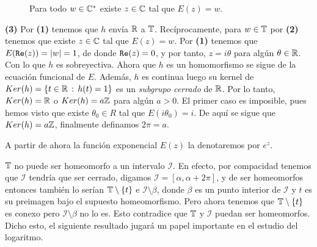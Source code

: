 \begin{dem}
\begin{figure}[H]
        \caption{Para todo \(w\in \mathbb{C}^*\) existe \(z\in \mathbb{C}\) tal que \(E(z)=w\).}
    \end{figure}
    {\bf (3)} Por {\bf(1)} tenemos que \(h\) envía \(\mathbb{R}\) a \(\mathbb{T}\). Recíprocamente, para \(w\in\mathbb{T}\) por {\bf (2)} tenemos que existe
    \(z\in \mathbb{C}\) tal que \(E(z)= w\). Por {\bf (1)} tenemos que \(E(\mathtt{Re}(z)) = \left\lvert w\right\rvert = 1\), de donde \(\mathtt{Re}(z) = 0\), y por tanto, \(z= i\theta\)
    para algún \(\theta \in \mathbb{R}\). Con lo que \(h\) es sobreyectiva. Ahora que \(h\) es un homomorfismo se sigue de la ecuación funcional de \(E\).
    Además, \(h\) es continua luego su kernel de \(Ker(h) = \{ t\in \mathbb{R} \, : \, h(t)=1\}\) es un {\it subgrupo cerrado} de \(\mathbb{R}\). Por lo tanto, 
    \(Ker(h) = \mathbb{R}\) o \(Ker(h) = a\mathbb{Z}\) para algún \(a>0\). El primer caso es imposible, pues hemos visto que existe \(\theta_0 \in R\) tal que
    \(E(i\theta_0) = i\). De aquí se sigue que \(Ker(h) = a\mathbb{Z}\), finalmente definamos \(2\pi = a\).
\end{dem}

\begin{notacion}
    A partir de ahora la función exponencial \(E(z)\) la denotaremos por \(e^z\).
\end{notacion}
    

\begin{obs}
\(\mathbb{T}\) no puede ser homeomorfo a un intervalo \(\mathcal{I}\). En efecto, por compacidad tenemos que \(\mathcal{I}\) tendría que 
ser cerrado, digamos \(\mathcal{I} = [\alpha, \alpha + 2\pi]\), y de ser homeomorfos entonces también lo serían \(\mathbb{T} \setminus \{t\}\) e 
\(\mathcal{I}\setminus \beta\), donde \(\beta\) es un punto interior de \(\mathcal{I}\) y \(t\) es su preimagen bajo el supuesto homeomorfismo. 
Pero ahora tenemos que \(\mathbb{T} \setminus \{t\} \) es conexo pero \(\mathcal{I} \setminus \beta \) no lo es. Esto contradice que \(\mathbb{T}\) y \(\mathcal{I}\) puedan
ser homeomorfos. Dicho esto, el siguiente resultado jugará un papel importante en el estudio del logaritmo.
\end{obs}

